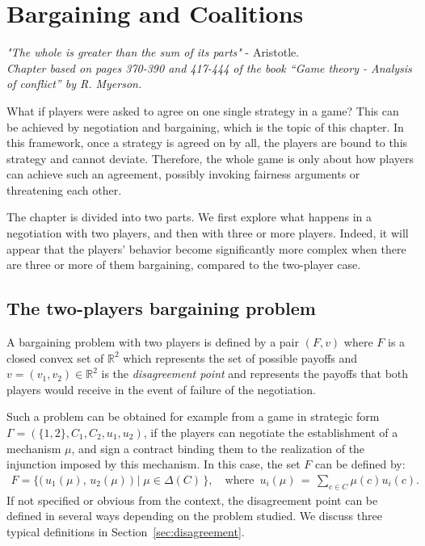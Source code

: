 \ifx \globalmark \undefined %
	
\else 	
\fi




\chapter{Bargaining and Coalitions}
{\large{\itshape
"The whole is greater than the sum of its parts"} - Aristotle.\\
}
\label{chap:Bar}
{\small{\itshape
Chapter based on pages 370-390 and 417-444 of the book  ``Game theory - Analysis of conflict'' by R. Myerson.}\\
}


What if players were asked to agree on one single strategy in a game? This can be achieved by negotiation and bargaining, which is the topic of this chapter. In this framework, once a strategy is agreed on by all, the players are bound to this strategy and cannot deviate. Therefore, the whole game is only about how players can achieve such an agreement, possibly invoking fairness arguments or threatening each other.

The chapter is divided into two parts. We first explore what happens in a negotiation with two players, and then with three or more players. Indeed, it will appear that the players' behavior become significantly more complex when there are three or more of them bargaining, compared to the two-player case.



\section{The two-players bargaining problem}



A bargaining problem with two players is defined by a pair $(F, v)$ where $F$ is a closed convex set of $\mathbb{R}^2$ which represents the set of possible payoffs and $v = (v_1, v_2) \in \mathbb{R}^2$ is the \emph{disagreement point} and represents the payoffs that both players would receive in the event of failure of the negotiation.

Such a problem can be obtained for example from a game in strategic form $\Gamma = (\{ 1,2 \}, C_1, C_2, u_1, u_2)$, if the players can negotiate the establishment of a mechanism $\mu$, and sign a contract binding them to the realization of the injunction imposed by this mechanism. In this case, the set $F$ can be defined by:
\begin{align*}
	F = \Big\{ \big( \, u_1(\mu), \, u_2(\mu) \, \big) \; | \; \mu \in \Delta(C) \, \Big\}, \quad \text{where } \, u_i(\mu) \, = \, \sum_{c \in C} \mu(c) u_i(c).
\end{align*}
If not specified or obvious from the context, the disagreement point can be defined in several ways depending on the problem studied. We discuss three typical definitions in Section~\ref{sec:disagreement}.


